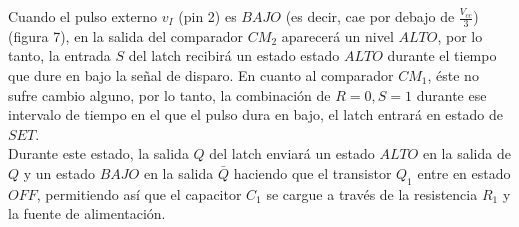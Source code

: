 \documentclass{article}
\begin{document}
Cuando el pulso externo $v_I$ (pin 2) es $BAJO$ (es decir, cae por debajo de $\frac{V_{cc}}{3}$) (figura 7), en la salida del comparador $CM_2$ aparecerá un nivel $ALTO$, por lo tanto, la entrada $S$ del latch recibirá un estado estado $ALTO$ durante el tiempo que dure en bajo la señal de disparo. En cuanto al comparador $CM_1$, éste no sufre cambio alguno, por lo tanto, la combinación de $R=0, S=1$ durante ese intervalo de tiempo en el que el pulso dura en bajo, el latch entrará en estado de $SET$. \\

\noindent Durante este estado, la salida $Q$ del latch enviará un estado $ALTO$ en la salida de $Q$ y un estado $BAJO$ en la salida $\bar{Q}$ haciendo que el transistor $Q_1$ entre en estado $OFF$, permitiendo así que el capacitor $C_1$ se cargue a través de la resistencia $R_1$ y la fuente de alimentación. \\
\end{document}

